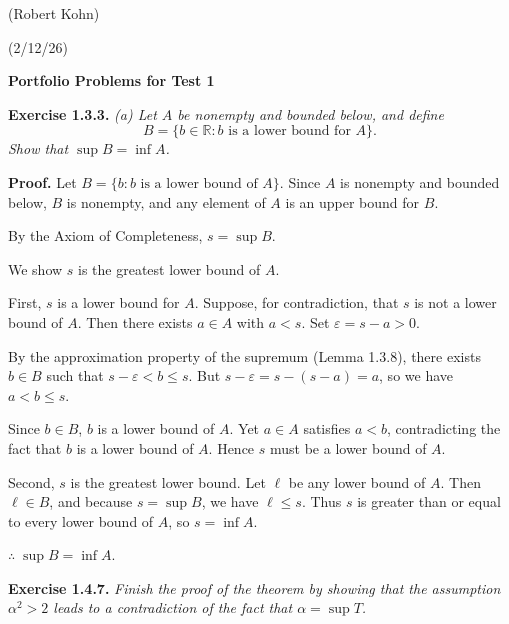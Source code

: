 \documentclass[reqno,11pt]{amsart}
\begin{document}
\begin{flushright} (Robert Kohn) \end{flushright}
\begin{flushright} (2/12/26)\end{flushright}
\vspace{0.2in}
\begin{center}
{\bf Portfolio Problems for Test 1}
\vspace{0.2in}
\end{center}

\noindent\textbf{Exercise 1.3.3.}  
\textit{(a) Let \( A \) be nonempty and bounded below, and define}
\[
B = \{ b \in \mathbb{R} : b \text{ is a lower bound for } A \}.
\]
\textit{Show that \( \sup B = \inf A \).}
\medskip

\noindent\textbf{Proof.}
Let \( B = \{ b : b \text{ is a lower bound of } A \} \).  
Since \( A \) is nonempty and bounded below, \( B \) is nonempty, and any element of \( A \) is an upper bound for \( B \).  

By the Axiom of Completeness, \( s = \sup B \).

We show \( s \) is the greatest lower bound of \( A \).

First, \( s \) is a lower bound for \( A \).  
Suppose, for contradiction, that \( s \) is not a lower bound of \( A \).  
Then there exists \( a \in A \) with \( a < s \).  
Set \( \varepsilon = s - a > 0 \).  

By the approximation property of the supremum (Lemma 1.3.8), there exists \( b \in B \) such that \( s - \varepsilon < b \le s \).  
But \( s - \varepsilon = s - (s - a) = a \), so we have \( a < b \le s \).  

Since \( b \in B \), \( b \) is a lower bound of \( A \). Yet \( a \in A \) satisfies \( a < b \), contradicting the fact that \( b \) is a lower bound of \( A \).  
Hence \( s \) must be a lower bound of \( A \).

Second, \( s \) is the greatest lower bound.  
Let \( \ell \) be any lower bound of \( A \). Then \( \ell \in B \), and because \( s = \sup B \), we have \( \ell \le s \).  
Thus \( s \) is greater than or equal to every lower bound of \( A \), so $s=\inf A$.

$\therefore \; \sup B = \inf A$.

\newpage

\noindent\textbf{Exercise 1.4.7.}
\textit{Finish the proof of the theorem by showing that the assumption $\alpha^2 > 2$ leads to a contradiction of the fact that $\alpha = \sup T$.}
\medskip
\end{document}
